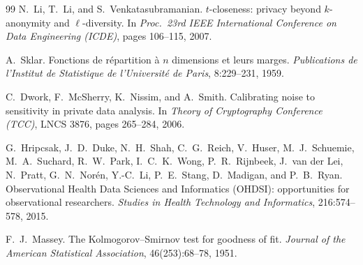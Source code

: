 \documentclass[11pt,a4paper]{article}
\begin{document}
\begin{thebibliography}{99}
 N.~Li, T.~Li, and S.~Venkatasubramanian. $t$-closeness: privacy beyond $k$-anonymity and $\ell$-diversity. In \emph{Proc.\ 23rd IEEE International Conference on Data Engineering (ICDE)}, pages 106--115, 2007.

 A.~Sklar. Fonctions de répartition à $n$ dimensions et leurs marges. \emph{Publications de l'Institut de Statistique de l'Université de Paris}, 8:229--231, 1959.

 C.~Dwork, F.~McSherry, K.~Nissim, and A.~Smith. Calibrating noise to sensitivity in private data analysis. In \emph{Theory of Cryptography Conference (TCC)}, LNCS 3876, pages 265--284, 2006.

 G.~Hripcsak, J.~D.~Duke, N.~H.~Shah, C.~G.~Reich, V.~Huser, M.~J.~Schuemie, M.~A.~Suchard, R.~W.~Park, I.~C.~K.~Wong, P.~R.~Rijnbeek, J.~van der Lei, N.~Pratt, G.~N.~Norén, Y.-C.~Li, P.~E.~Stang, D.~Madigan, and P.~B.~Ryan. Observational Health Data Sciences and Informatics (OHDSI): opportunities for observational researchers. \emph{Studies in Health Technology and Informatics}, 216:574--578, 2015.

 F.~J.~Massey. The Kolmogorov--Smirnov test for goodness of fit. \emph{Journal of the American Statistical Association}, 46(253):68--78, 1951.

\end{thebibliography}
\end{document}
